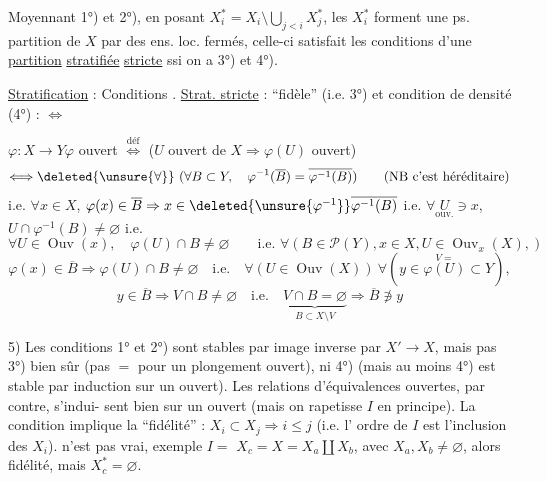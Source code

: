 Moyennant 1°) et 2°), en posant $X_i^*=X_i\setminus\bigcup_{j<i}X_j^*$,
les $X_i^*$ forment une ps. partition  de $X$ par des
ens. loc. fermés, celle-ci satisfait les conditions
d'une \uline{partition} \uline{stratifiée} \uline{stricte}  ssi
on a 3°) et 4°).

\uline{Stratification} : Conditions . \uline{Strat. stricte} : ``fidèle'' (i.e.
3°) et condition de densité (4°) :  $\Longleftrightarrow$ 


$\varphi:X\longrightarrow Y$\qquad $\varphi$ ouvert $\overset{\mathrm{déf}}\Longleftrightarrow$ ($U$ ouvert de $X\Rightarrow\varphi(U)$ ouvert)
\[
\Longleftrightarrow\deleted{\unsure{\forall}}\ (\forall B\subset Y,\quad\varphi^{-1}(\overline B)=\overline{\varphi^{-1}(B)})
\qquad(\text{NB c'est héréditaire})
\]
i.e. $\forall x\in X$, $\varphi(x)\in\overline B\Rightarrow x\in\deleted{\unsure{\varphi^{-1}}}\overline{\varphi^{-1}(B)}$
i.e. $\forall\underset{\mathrm{ouv.}}{U}\ni x$, $U\cap\varphi^{-1}(B)\ne\varnothing$ i.e.
\[
\forall U\in\operatorname{Ouv}(x),\quad\varphi(U)\cap B\ne\varnothing
\qquad\text{i.e. }\forall(B\in\mathcal P(Y),x\in X,U\in\operatorname{Ouv}_x(X),)
\]
\[
\varphi(x)\in\overline B\Rightarrow\varphi(U)\cap B\ne\varnothing\quad\text{i.e.}\quad
\forall(U\in\operatorname{Ouv}(X))\ \forall(y\in\overset{V=}{\varphi(U)}\subset Y),
\]
\[
y\in\overline B\Rightarrow V\cap B\ne\varnothing\quad\text{i.e.}\quad
\underbrace{V\cap B=\varnothing}_{B\subset X\setminus V}\Rightarrow\overline B\not\ni y
\]

5) Les conditions 1° et 2°) sont stables par image inverse
par $X'\longrightarrow X$, mais pas 3°) bien sûr (pas $=$ pour
un plongement ouvert), ni 4°) (mais au moins
4°) est stable par induction sur un ouvert). Les
relations d'équivalences ouvertes, par contre, s'indui-
sent bien sur un ouvert (mais on rapetisse $I$
en principe). 
La condition 
implique la ``fidélité'' : $X_i\subset X_j\Rightarrow i\leq j$ (i.e. l'
ordre de $I$ est l'inclusion des $X_i$). 
n'est pas vrai, exemple $I=$
$X_c=X=X_a\amalg X_b$,  avec $X_a,X_b\ne\varnothing$, alors 
fidélité,  mais $X_c^*=\varnothing$.

